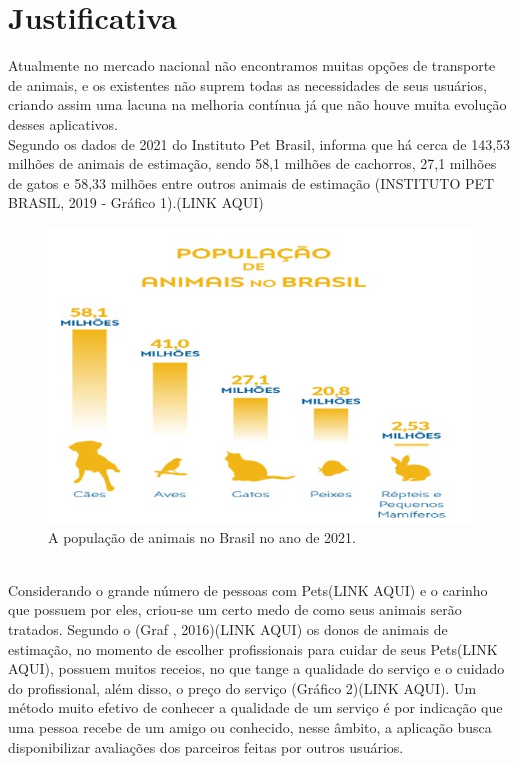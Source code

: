 \section{Justificativa}
Atualmente no mercado nacional não encontramos muitas opções de transporte de animais, e os existentes não suprem todas as necessidades de seus usuários, criando assim uma lacuna na melhoria contínua já que não houve muita evolução desses aplicativos.\\
Segundo os dados de 2021 do Instituto Pet Brasil, informa que há cerca de 143,53 milhões de animais de estimação, sendo 58,1 milhões de cachorros, 27,1 milhões de gatos e 58,33 milhões entre outros animais de estimação (INSTITUTO PET BRASIL, 2019 - Gráfico 1).(LINK AQUI)
\begin{figure}
    \centering
    \includegraphics{exemplos/diagramas/População_Animais.jpeg}
    \caption{A população de animais no Brasil no ano de 2021.}
    \label{fig:População_Animais}
\end{figure}
\\
Considerando o grande número de pessoas com Pets(LINK AQUI) e o carinho que possuem por eles, criou-se   um certo medo de como seus animais serão tratados. Segundo o (Graf , 2016)(LINK AQUI) os donos de animais de estimação, no momento de escolher profissionais para cuidar de seus Pets(LINK AQUI), possuem muitos receios, no que tange a qualidade do serviço e o cuidado do profissional, além disso, o preço do serviço (Gráfico 2)(LINK AQUI).
Um método muito efetivo de conhecer a qualidade de um serviço é por indicação que uma pessoa recebe de um amigo ou conhecido,  nesse âmbito, a aplicação busca disponibilizar avaliações dos parceiros feitas por outros usuários. 
